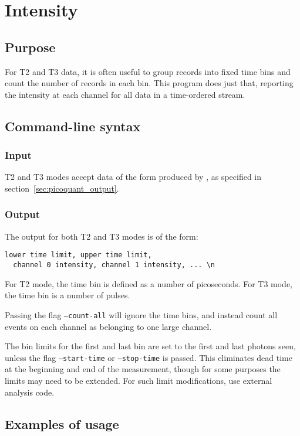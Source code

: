 \section{Intensity}
\subsection{Purpose}
For T2 and T3 data, it is often useful to group records into fixed time bins and count the number of records in each bin. This program does just that, reporting the intensity at each channel for all data in a time-ordered stream. 

\subsection{Command-line syntax}
%

\subsubsection{Input}
T2 and T3 modes accept data of the form produced by , as specified in section~\ref{sec:picoquant_output}.

\subsubsection{Output}
The output for both T2 and T3 modes is of the form:
\begin{verbatim}
lower time limit, upper time limit, 
  channel 0 intensity, channel 1 intensity, ... \n
\end{verbatim}
For T2 mode, the time bin is defined as a number of picoseconds. For T3 mode, the time bin is a number of pulses.

Passing the flag \texttt{--count-all} will ignore the time bins, and instead count all events on each channel as belonging to one large channel. 

The bin limits for the first and last bin are set to the first and last photons seen, unless the flag \texttt{--start-time} or \texttt{--stop-time} is passed. This eliminates dead time at the beginning and end of the measurement, though for some purposes the limits may need to be extended. For such limit modifications, use external analysis code.

\subsection{Examples of usage}
